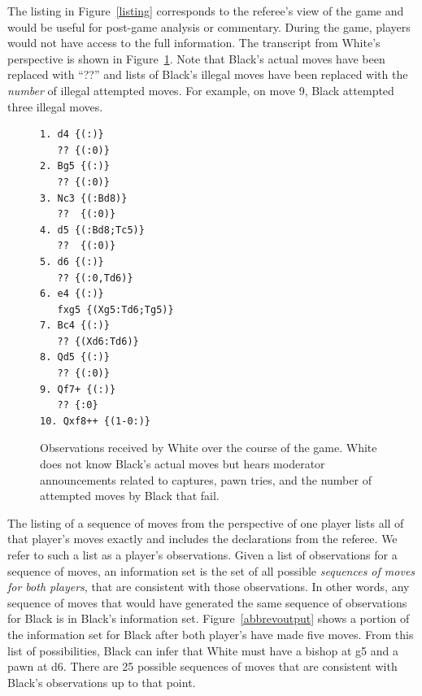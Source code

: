 \documentclass[10pt, conference, compsocconf]{IEEEtran}
\begin{document}
The listing in Figure~\ref{listing} corresponds to the referee's view of the game and would be useful for
post-game analysis or commentary.  During the game, players would not have access to the full information.  The
transcript from White's perspective is shown in Figure~\ref{filteredlisting}.  Note that Black's actual moves have been
replaced with ``??'' and lists of Black's illegal moves have been replaced with the {\em number} of illegal attempted
moves.  For example, on move 9, Black attempted three illegal moves.
\begin{figure}
\begin{verbatim}
1. d4 {(:)}
   ?? {(:0)}
2. Bg5 {(:)}
   ?? {(:0)}
3. Nc3 {(:Bd8)}
   ??  {(:0)}
4. d5 {(:Bd8;Tc5)}
   ??  {(:0)}
5. d6 {(:)}
   ?? {(:0,Td6)}
6. e4 {(:)}
   fxg5 {(Xg5:Td6;Tg5)}
7. Bc4 {(:)}
   ?? {(Xd6:Td6)}
8. Qd5 {(:)}
   ?? {(:0)}
9. Qf7+ {(:)} 
   ?? {:0}
10. Qxf8++ {(1-0:)}
\end{verbatim}
\caption{Observations received by White over the course of the game.  White does not know Black's actual moves but hears moderator announcements related to captures, pawn tries, and the number of attempted moves by Black that fail.}
\label{filteredlisting}
\vspace{-0.2in}
\end{figure}

The listing of a sequence of moves from the perspective of one player lists all of that player's moves exactly and
includes the declarations from the referee.  We refer to such a list as a player's observations.  Given a list of
observations for a sequence of moves, an information set is the set of all possible {\em sequences of moves for both
players}, that are consistent with those observations.  In other words, any sequence of moves that would have generated
the same sequence of observations for Black is in Black's information set.  Figure~\ref{abbrevoutput} shows a portion of the
information set for Black after both player's have made five moves.  From this list of possibilities, Black can infer
that White must have a bishop at g5 and a pawn at d6.  There are 25 possible sequences of moves that are consistent with
Black's observations up to that point. 
\end{document}
